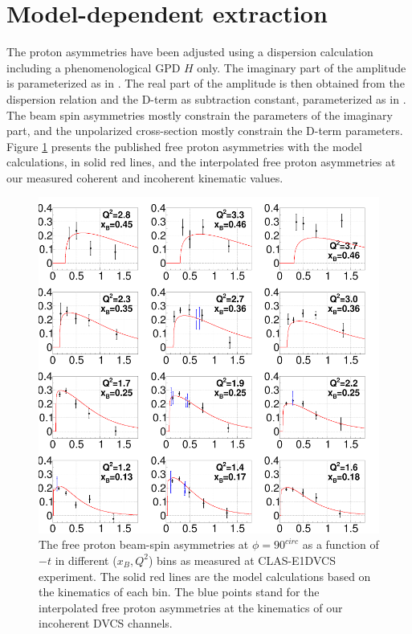 \section{Model-dependent extraction} \label{model_int}
The proton asymmetries have been adjusted using a dispersion calculation 
including a phenomenological GPD $H$ only. The imaginary part of the amplitude 
is parameterized as in \cite{GPD_cal_free_p}. The real part of the amplitude is 
then obtained from the dispersion relation and the D-term as subtraction 
constant, parameterized as in \cite{GPD_cal_free_p}. The beam spin asymmetries 
mostly constrain the parameters of the imaginary part, and the unpolarized 
cross-section mostly constrain the D-term parameters. Figure 
\ref{fig:FXfree-proton-alu} presents the published free proton asymmetries with 
the model calculations, in solid red lines, and the interpolated free proton 
asymmetries at our measured coherent and incoherent kinematic values.

\begin{figure}[tpb]
   \centering
\includegraphics[scale=0.55]{fig_updated/From_FX_Check_Fit_6GeV_asym.png}
\caption{The free proton beam-spin asymmetries at $\phi = 90^{circ}$ as a 
function of $-t$ in different ($x_B, Q^2$) bins as measured at CLAS-E1DVCS 
experiment. The solid red lines are the model calculations based on the 
kinematics of each bin. The blue points stand for the interpolated free proton 
asymmetries at the kinematics of our incoherent DVCS channels.}
\label{fig:FXfree-proton-alu}
\end{figure}


